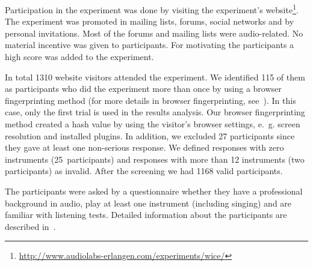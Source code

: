 Participation in the experiment was done by visiting the experiment's website\footnote{{\scriptsize\url{http://www.audiolabs-erlangen.com/experiments/wice/}}}. The experiment was promoted in mailing lists, forums, social networks and by personal invitations. Most of the forums and mailing lists were audio-related. No material incentive was given to participants. For motivating the participants a high score was added to the experiment.
\par
In total 1310 website visitors attended the experiment. 
We identified 115 of them as participants who did the experiment more than once by using a browser fingerprinting method (for more details in browser fingerprinting, see~\cite{Eckersley2010}). 
In this case, only the first trial is used in the results analysis. 
Our browser fingerprinting method created a hash value by using the visitor's browser settings, e.~g. screen resolution and installed plugins. In addition, we excluded 27 participants since they gave at least one non-serious response. We defined responses with zero instruments (25~participants) and responses with more than 12 instruments (two participants) as invalid. After the screening we had 1168 valid participants.
\par
The participants were asked by a questionnaire whether they have a professional background in audio, play at least one instrument (including singing) and are familiar with listening tests. Detailed information about the participants are described in~\cite{schoeffler13}.
